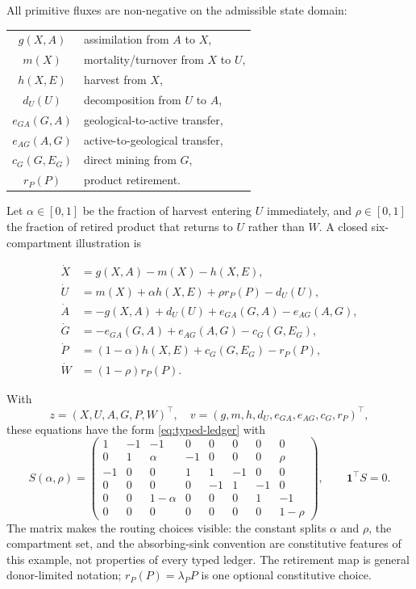 \documentclass[11pt]{article}
\begin{document}
All primitive fluxes are non-negative on the admissible state domain:

\begin{center}
\begin{tabular}{cl}
$g(X,A)$ & assimilation from $A$ to $X$,\\
$m(X)$ & mortality/turnover from $X$ to $U$,\\
$h(X,E)$ & harvest from $X$,\\
$d_U(U)$ & decomposition from $U$ to $A$,\\
$e_{GA}(G,A)$ & geological-to-active transfer,\\
$e_{AG}(A,G)$ & active-to-geological transfer,\\
$c_G(G,E_G)$ & direct mining from $G$,\\
$r_P(P)$ & product retirement.
\end{tabular}
\end{center}

Let $\alpha\in[0,1]$ be the fraction of harvest entering $U$ immediately, and $\rho\in[0,1]$ the fraction of retired product that returns to $U$ rather than $W$. A closed six-compartment illustration is

\begin{align}
\dot X &= g(X,A)-m(X)-h(X,E), \label{eq:X}\\
\dot U &= m(X)+\alpha h(X,E)+\rho r_P(P)-d_U(U), \label{eq:U}\\
\dot A &= -g(X,A)+d_U(U)+e_{GA}(G,A)-e_{AG}(A,G), \label{eq:A}\\
\dot G &= -e_{GA}(G,A)+e_{AG}(A,G)-c_G(G,E_G), \label{eq:G}\\
\dot P &= (1-\alpha)h(X,E)+c_G(G,E_G)-r_P(P), \label{eq:P}\\
\dot W &= (1-\rho)r_P(P). \label{eq:W}
\end{align}

With
\[
z=(X,U,A,G,P,W)^\top,
\quad
v=(g,m,h,d_U,e_{GA},e_{AG},c_G,r_P)^\top,
\]
these equations have the form \eqref{eq:typed-ledger} with
\[
S(\alpha,\rho)=
\begin{pmatrix}
 1&-1&-1& 0& 0& 0& 0& 0\\
 0& 1&\alpha&-1& 0& 0& 0&\rho\\
-1& 0& 0& 1& 1&-1& 0& 0\\
 0& 0& 0& 0&-1& 1&-1& 0\\
 0& 0&1-\alpha&0&0&0&1&-1\\
 0& 0& 0& 0& 0& 0& 0&1-\rho
\end{pmatrix},
\qquad \mathbf 1^\top S=0.
\]
The matrix makes the routing choices visible: the constant splits $\alpha$ and $\rho$, the compartment set, and the absorbing-sink convention are constitutive features of this example, not properties of every typed ledger. The retirement map is general donor-limited notation; $r_P(P)=\lambda_P P$ is one optional constitutive choice.
\end{document}
